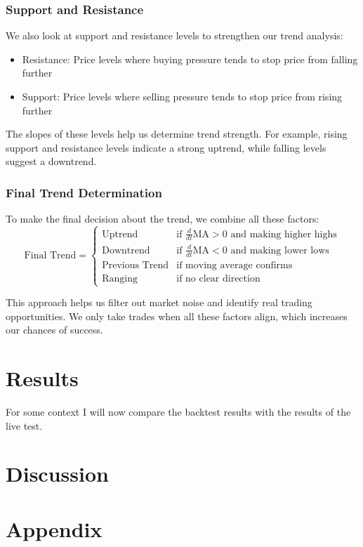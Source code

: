 \documentclass[12pt]{article}
\begin{document}
\subsubsection*{Support and Resistance}
We also look at support and resistance levels to strengthen our trend analysis:

\begin{itemize}
    \item Resistance: Price levels where buying pressure tends to stop price from falling further
    \item Support: Price levels where selling pressure tends to stop price from rising further
\end{itemize}

The slopes of these levels help us determine trend strength. For example, rising support and resistance levels indicate a strong uptrend, while falling levels suggest a downtrend.

\subsubsection*{Final Trend Determination}
To make the final decision about the trend, we combine all these factors:
\begin{equation*}
\text{Final Trend} = \begin{cases}
    \text{Uptrend} & \text{if } \frac{d}{dt}\text{MA} > 0 \text{ and making higher highs} \\
    \text{Downtrend} & \text{if } \frac{d}{dt}\text{MA} < 0 \text{ and making lower lows} \\
    \text{Previous Trend} & \text{if moving average confirms} \\
    \text{Ranging} & \text{if no clear direction}
\end{cases}
\end{equation*}

This approach helps us filter out market noise and identify real trading opportunities. We only take trades when all these factors align, which increases our chances of success.





\newpage
\section{Results}


For some context I will now compare the backtest results with the results of the live test. 











\newpage
\section{Discussion}


\newpage
\section{Appendix}
\end{document}
